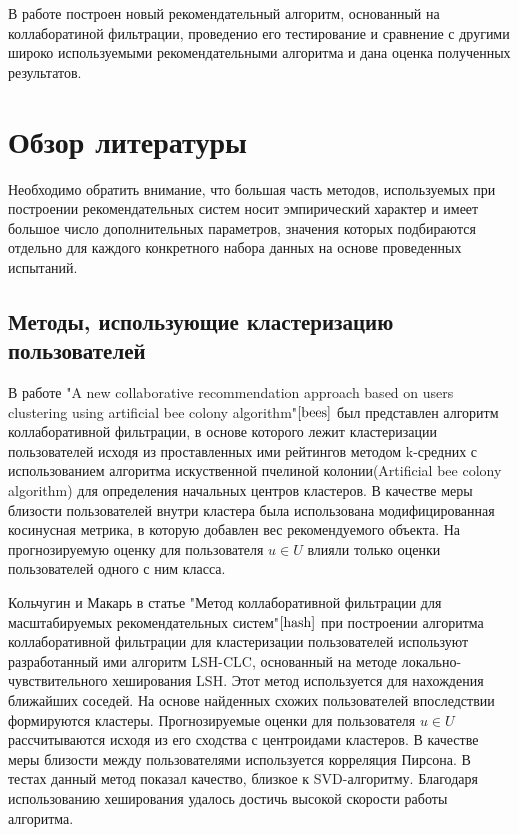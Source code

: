 \documentclass[12pt]{article} %
\begin{document}
В работе построен новый рекомендательный алгоритм, основанный на коллаборатиной фильтрации, проведенио его тестирование и сравнение с другими широко используемыми рекомендательными алгоритма и дана оценка полученных результатов.


\section{Обзор литературы}
Необходимо обратить внимание, что большая часть методов, используемых при построении рекомендательных систем носит эмпирический характер и имеет большое число дополнительных параметров, значения которых подбираются отдельно для каждого конкретного набора данных на основе проведенных испытаний.
\subsection{Методы, использующие кластеризацию пользователей}
\par
В работе "A new collaborative recommendation approach based on users clustering using artificial bee colony algorithm"$\cite{bees}$ был представлен алгоритм коллаборативной фильтрации, в основе которого лежит кластеризации пользователей исходя из проставленных ими рейтингов методом k-средних с использованием алгоритма искуственной пчелиной колонии(Artificial bee colony algorithm) для определения начальных центров кластеров. В качестве меры близости пользователей внутри кластера была использована модифицированная косинусная метрика, в которую добавлен вес рекомендуемого объекта. На прогнозируемую оценку для пользователя $u \in U$  влияли только оценки пользователей одного с ним класса. 

\par 
Кольчугин и Макарь в статье "Метод коллаборативной фильтрации для масштабируемых рекомендательных систем"$\cite{hash}$ при построении алгоритма коллаборативной фильтрации для кластеризации пользователей используют разработанный ими алгоритм LSH-CLC, основанный на методе локально-чувствительного хеширования LSH. Этот метод используется для нахождения ближайших соседей. На основе найденных схожих пользователей впоследствии формируются кластеры. Прогнозируемые оценки для пользователя $u \in U$ рассчитываются исходя из его сходства с центроидами кластеров. В качестве меры близости между пользователями используется корреляция Пирсона.  В тестах данный метод показал качество, близкое к SVD-алгоритму. Благодаря использованию хеширования удалось достичь высокой скорости работы алгоритма.   
\end{document}
